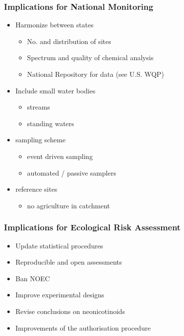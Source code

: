 \documentclass[
	12pt
	]{beamer}
\begin{document}
\begin{frame}
\frametitle{Implications for National Monitoring}
	\begin{itemize}
    	\item Harmonize between states
	    	\begin{itemize}
		    	\item No. and distribution of sites
		    	\item Spectrum and quality of chemical analysis
		    	\item National Repository for data (see U.S. WQP)
		    \end{itemize}
	    \item Include small water bodies
		    \begin{itemize}
		    	\item streams
		    	\item standing waters
		    \end{itemize}
		\item sampling scheme
			\begin{itemize}
		    	\item event driven sampling
		    	\item automated / passive samplers
		    \end{itemize}
		\item reference sites
			\begin{itemize}
		    	\item no agriculture in catchment
		    \end{itemize}
    \end{itemize}
\end{frame}





\begin{frame}
\frametitle{Implications for Ecological Risk Assessment}
	\begin{itemize}
    	\item Update statistical procedures
    	\item Reproducible and open assessments
    	\item Ban NOEC
    	\item Improve experimental designs
    	\item Revise conclusions on neonicotinoids
    	\item Improvements of the authorisation procedure
    \end{itemize}
\end{frame}
\end{document}
